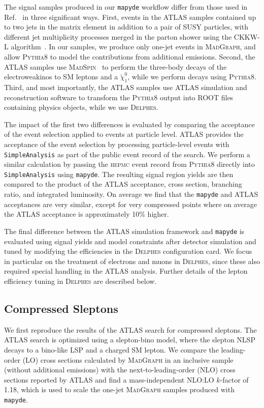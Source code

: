 \documentclass{article}
\newcommand{\chioz}{\ensuremath{\widetilde{\chi}_{1}^{0}}}
\newcommand{\mapyde}{\texttt{mapyde}}
\newcommand{\simpleanalysis}{\texttt{SimpleAnalysis}}
\newcommand{\madgraph}{\textsc{MadGraph}}
\newcommand{\madspin}{\textsc{MadSpin}}
\newcommand{\pythia}{\textsc{Pythia8}}
\newcommand{\delphes}{\textsc{Delphes}}
\newcommand{\hepmc}{\textsc{hepmc}}
\begin{document}
The signal samples produced in our \mapyde{} workflow differ from those used in Ref.~\cite{ATLAS:2019lng} in three significant ways.  First, events in the ATLAS samples contained up to two jets in the matrix element in addition to a pair of SUSY particles, with different jet multiplicity processes merged in the parton shower using the CKKW-L algorithm~\cite{Lonnblad:2011xx}.  In our samples, we produce only one-jet events in \madgraph, and allow \pythia{} to model the contributions from additional emissions.  Second, the ATLAS samples use \madspin{}~\cite{Artoisenet:2012st} to perform the three-body decays of the electroweakinos to SM leptons and a \chioz, while we perform decays using \pythia.  Third, and most importantly, the ATLAS samples use ATLAS simulation and reconstruction software to transform the \pythia{} output into ROOT files containing physics objects, while we use \delphes.

The impact of the first two differences is evaluated by comparing the acceptance of the event selection applied to events at particle level.  ATLAS provides the acceptance of the event selection by processing particle-level events with \simpleanalysis{} as part of the public event record of the search.  We perform a similar calculation by passing the \hepmc{} event record from \pythia{} directly into \simpleanalysis{} using \mapyde.  The resulting signal region yields are then compared to the product of the ATLAS acceptance, cross section, branching ratio, and integrated luminosity.  On average we find that the \mapyde{} and ATLAS acceptances are very similar, except for very compressed points where on average the ATLAS acceptance is approximately 10\% higher.

The final difference between the ATLAS simulation framework and \mapyde{} is evaluated using signal yields and model constraints after detector simulation and tuned by modifying the efficiencies in the \delphes{} configuration card.  We focus in particular on the treatment of electrons and muons in \delphes, since these also required special handling in the ATLAS analysis.  Further details of the lepton efficiency tuning in \delphes{} are described below.

\subsection{Compressed Sleptons}
\label{ssec:compressed-sleptons}

We first reproduce the results of the ATLAS search for compressed sleptons.  The ATLAS search is optimized using a slepton-bino model, where the slepton NLSP decays to a bino-like LSP and a charged SM lepton.  We compare the leading-order (LO) cross sections calculated by \madgraph{} in an inclusive sample (without additional emissions) with the next-to-leading-order (NLO) cross sections reported by ATLAS and find a mass-independent NLO:LO $k$-factor of 1.18, which is used to scale the one-jet \madgraph{} samples produced with \mapyde.
\end{document}
